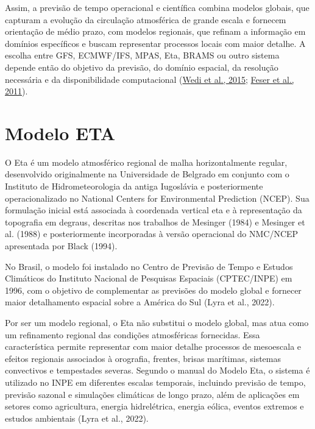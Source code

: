 \documentclass[12pt,a4paper,oneside]{book}
\begin{document}
Assim, a previsão de tempo operacional e científica combina modelos globais, que capturam a evolução da circulação atmosférica de grande escala e fornecem orientação de médio prazo, com modelos regionais, que refinam a informação em domínios específicos e buscam representar processos locais com maior detalhe. A escolha entre GFS, ECMWF/IFS, MPAS, Eta, BRAMS ou outro sistema depende então do objetivo da previsão, do domínio espacial, da resolução necessária e da disponibilidade computacional (\href{https://www.ecmwf.int/sites/default/files/elibrary/2015/15259-modelling-infrastructure-integrated-forecasting-system-recent-advances-and-future-challenges.pdf}{Wedi et al., 2015}; \href{https://www.hereon.de/imperia/md/content/gkss/zentrale_einrichtungen/bibliothek/journals/2011/feser_29114.pdf}{Feser et al., 2011}).

\section{Modelo ETA}

O Eta é um modelo atmosférico regional de malha horizontalmente regular, desenvolvido originalmente na Universidade de Belgrado em conjunto com o Instituto de Hidrometeorologia da antiga Iugoslávia e posteriormente operacionalizado no National Centers for Environmental Prediction (NCEP). Sua formulação inicial está associada à coordenada vertical eta e à representação da topografia em degraus, descritas nos trabalhos de Mesinger (1984) e Mesinger et al. (1988) e posteriormente incorporadas à versão operacional do NMC/NCEP apresentada por Black (1994).

No Brasil, o modelo foi instalado no Centro de Previsão de Tempo e Estudos Climáticos do Instituto Nacional de Pesquisas Espaciais (CPTEC/INPE) em 1996, com o objetivo de complementar as previsões do modelo global e fornecer maior detalhamento espacial sobre a América do Sul (Lyra et al., 2022).

Por ser um modelo regional, o Eta não substitui o modelo global, mas atua como um refinamento regional das condições atmosféricas fornecidas. Essa característica permite representar com maior detalhe processos de mesoescala e efeitos regionais associados à orografia, frentes, brisas marítimas, sistemas convectivos e tempestades severas. Segundo o manual do Modelo Eta, o sistema é utilizado no INPE em diferentes escalas temporais, incluindo previsão de tempo, previsão sazonal e simulações climáticas de longo prazo, além de aplicações em setores como agricultura, energia hidrelétrica, energia eólica, eventos extremos e estudos ambientais (Lyra et al., 2022).
\end{document}
